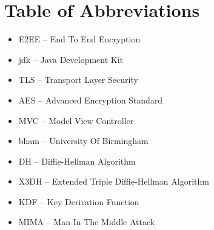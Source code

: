\section*{Table of Abbreviations}
\begin{itemize}[nolistsep]
\item E2EE -- End To End Encryption
\item jdk -- Java Development Kit
\item TLS -- Transport Layer Security
\item AES -- Advanced Encryption Standard
\item MVC -- Model View Controller
\item bham -- University Of Birmingham
\item DH -- Diffie-Hellman Algorithm
\item X3DH -- Extended Triple Diffie-Hellman Algorithm
\item KDF -- Key Derivation Function
\item MIMA -- Man In The Middle Attack
\end{itemize}